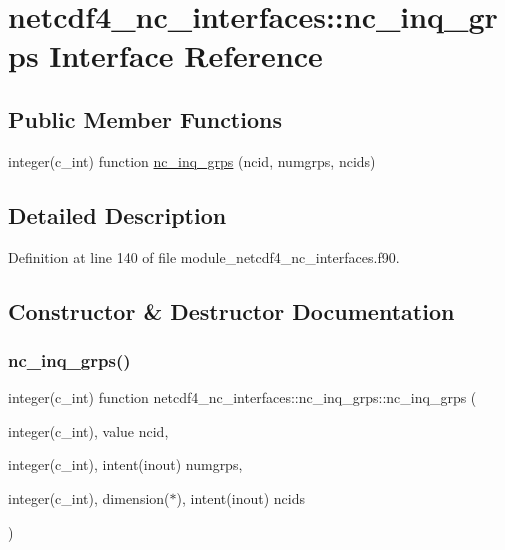 \hypertarget{interfacenetcdf4__nc__interfaces_1_1nc__inq__grps}{}\section{netcdf4\+\_\+nc\+\_\+interfaces\+:\+:nc\+\_\+inq\+\_\+grps Interface Reference}
\label{interfacenetcdf4__nc__interfaces_1_1nc__inq__grps}
\subsection*{Public Member Functions}
\begin{DoxyCompactItemize}
\item 
integer(c\+\_\+int) function \hyperlink{interfacenetcdf4__nc__interfaces_1_1nc__inq__grps_af2449a9fab36fda01fa6406bd351f190}{nc\+\_\+inq\+\_\+grps} (ncid, numgrps, ncids)
\end{DoxyCompactItemize}


\subsection{Detailed Description}


Definition at line 140 of file module\+\_\+netcdf4\+\_\+nc\+\_\+interfaces.\+f90.



\subsection{Constructor \& Destructor Documentation}
\mbox{\label{interfacenetcdf4__nc__interfaces_1_1nc__inq__grps_af2449a9fab36fda01fa6406bd351f190}} 
\subsubsection{\texorpdfstring{nc\+\_\+inq\+\_\+grps()}{nc\_inq\_grps()}}
{\footnotesize\ttfamily integer(c\+\_\+int) function netcdf4\+\_\+nc\+\_\+interfaces\+::nc\+\_\+inq\+\_\+grps\+::nc\+\_\+inq\+\_\+grps (\begin{DoxyParamCaption}\item[{integer(c\+\_\+int), value}]{ncid,  }\item[{integer(c\+\_\+int), intent(inout)}]{numgrps,  }\item[{integer(c\+\_\+int), dimension($\ast$), intent(inout)}]{ncids }\end{DoxyParamCaption})}




